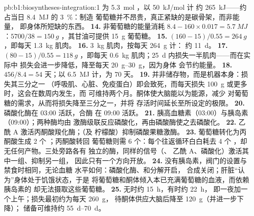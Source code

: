 \begin{solution}{pb:b1:biosyntheses-integration:1}
为 \qty{5.3}{mol} ，以 \qty{50}{kJ/mol} 计
约 \qty{265}{kJ}——约占当日 \qty{8.4}{MJ} 的 \qty{3}{\%}：制造
葡萄糖并不昂贵，真正紧缺的是碳骨架，而非能量，
即身体所短缺的东西。
\textbf{14.} 非葡萄糖的能量消耗 $8.4 - 160\times 0.017 =
\qty{5.7}{MJ}$：$5700/38 = \qty{150}{g}$ ，其甘油可提供
\qty{15}{g} 葡萄糖。
\textbf{15.} $(160 - 15)/0.55 = \qty{264}{g}$ ，即每天
\qty{1.3}{kg} 肌肉。
\textbf{16.} \qty{3}{kg} 肌肉，按每天 \qty{264}{g} 计：
约 \qty{11}{d}。
\textbf{17.} $(80 - 15)/0.55 = \qty{118}{g}$ ，即每天
\qty{0.6}{kg} 肌肉；\qty{25}{d} 内损失一半肌肉——而在实际中
损失会进一步降低，降至每天 \qtyrange{20}{30}{g}，因为身体
会节约能量。
\textbf{18.} $456/8.4 = 54$ 天；以 \qty{6.5}{MJ} 计，为 70 天。
\textbf{19.} 并非储存物，而是机器本身：损失其三分之一
（呼吸肌、心脏、免疫蛋白）即会致死，而每天损失
\qty{100}{g} 或更多时，这会在数周内发生，而
可维持两个月。酮体使大脑能以为能源，减少
对葡萄糖的需求，从而将损失降至三分之一，并将
存活时间延长至所设定的极限。
\textbf{20.} 磷酸化酶在 03:00 活跃，合酶
在 09:00 活跃。
\textbf{21.} 胰高血糖素（03:00）与胰岛素（09:00）；两种酶均由
激酶级联反应磷酸化，再由磷酸酶使之去磷酸化。
\textbf{22.} 乙酰 A 激活丙酮酸羧化酶；（及
柠檬酸）抑制磷酸果糖激酶。
\textbf{23.} 葡萄糖转化为丙酮酸生成 2 个 ；丙酮酸转回
葡萄糖则需 6 个：每个往返循环白白耗去 4 个 ，却无任何产物。三处旁路各有
独立的酶，同样的信号（、
乙酰 A、磷酸化）激活其中一组、抑制另一组，
因此只有一个方向开放。
\textbf{24.} 没有胰岛素，阀门的设置与禁食时相同，无论血糖
水平如何：磷酸化酶、和分解开启，
合成关闭；肝脏“认为”身体处于饥饿状态，于是
将葡萄糖和酮体倾入本已充满葡萄糖的血液，而依赖胰岛素的
却无法摄取这些葡萄糖。
\textbf{25.} 无时约 \qty{15}{h}，有时约 \qty{22}{h}，
即一夜加一个上午；损失最初约为每天 \qty{260}{g}，
待酮体供应大脑后降至 \qty{120}{g}（并进一步下降）；
储备可维持约 \qtyrange{55}{70}{d}。
\end{solution}
